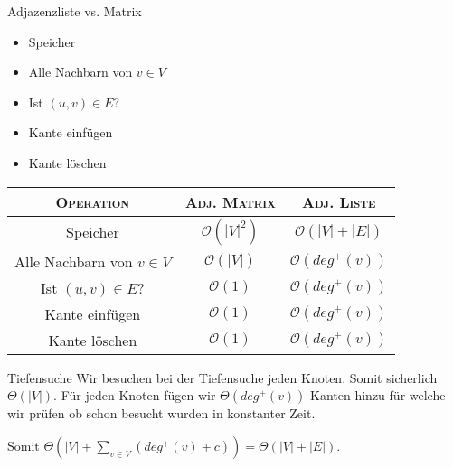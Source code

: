 \documentclass[avery5371,grid]{flashcards}
\begin{document}
\footnotesize


%



\begin{flashcard}[A\&D]{Adjazenzliste vs. Matrix \\{\small \begin{itemize}
\item Speicher
\item Alle Nachbarn von $v \in V$
\item Ist $(u,v)\in E$?
\item Kante einfügen
\item Kante löschen    
\end{itemize}}}
    \begin{tabular}{| c | c | c |}
        \textsc{Operation} & \textsc{Adj. Matrix} & \textsc{Adj. Liste}  \\ \hline
        Speicher &$\mathcal{O}(|V|^2)$ & $\mathcal{O}(|V| + |E|)$ \\ 
        Alle Nachbarn von $v \in V$ & $\mathcal{O}(|V|)$ & $\mathcal{O}(deg^{+}(v))$ \\
        Ist $(u,v)\in E$? & $\mathcal{O}(1)$ &$\mathcal{O}(deg^{+}(v))$ \\
        Kante einfügen &  $\mathcal{O}(1)$ & $\mathcal{O}(deg^{+}(v))$\\
        Kante löschen & $\mathcal{O}(1)$  &  $\mathcal{O}(deg^{+}(v))$
    \end{tabular}
\end{flashcard}






\begin{flashcard}[A\&D]{Tiefensuche}
        Wir besuchen bei der Tiefensuche jeden Knoten. Somit sicherlich ${\Theta}(|V|)$. Für jeden Knoten fügen wir ${\Theta}(deg^{+}(v))$ Kanten hinzu für welche wir prüfen ob schon besucht wurden in konstanter Zeit.
        \par 
        Somit ${\Theta}(|V| + \sum_{v\in V} (deg^{+}(v) + c) ) = {\Theta}(|V| + |E|)$.
\end{flashcard}
\end{document}
